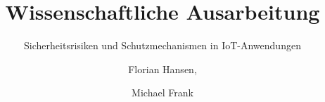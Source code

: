\documentclass{hsflensburg}
\title{Wissenschaftliche Ausarbeitung}
\subtitle{Sicherheitsrisiken und Schutzmechanismen in IoT-Anwendungen}
\author{
	Florian Hansen,
	\and
	Michael Frank
}
\begin{document}
	\maketitle
  \tableofcontents

  \pagebreak
  
  
  
  
  

	\clearpage
	
	
\end{document}
